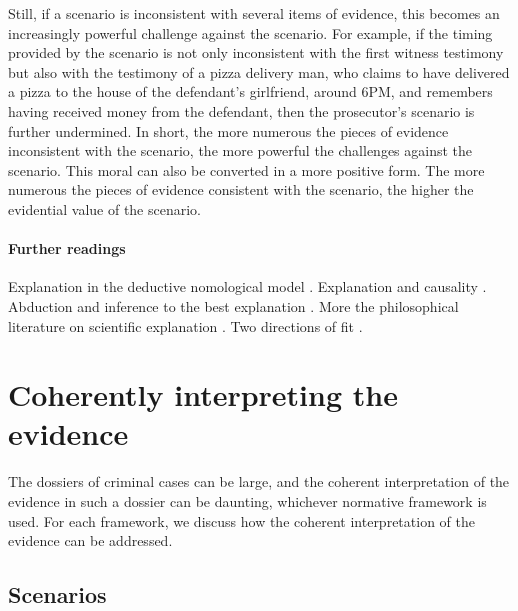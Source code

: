 \documentclass[10pt]{article}
\begin{document}
Still, if a scenario is inconsistent with several items of evidence, this becomes an increasingly powerful challenge against the scenario. 
For example, if the timing provided by the scenario is not only inconsistent 
with the first witness testimony but also with the testimony of a pizza delivery man, 
who claims to have delivered a pizza to the house of the defendant's girlfriend, around 6PM, and remembers having received money 
from the defendant, then the prosecutor's scenario is further undermined. In short, the more numerous the pieces of evidence 
inconsistent with the scenario, the more powerful the challenges against the scenario.
This moral can also be converted in a more positive form. The more numerous the pieces of evidence consistent with the scenario, 
the higher the evidential value of the scenario.







\paragraph{Further readings}

Explanation in the deductive nomological model \citep{hempelOppenhaim1948}. 
Explanation and causality \citep{salmon1984}. 
Abduction and inference to the best explanation \citep{lipton1991}.
More the philosophical literature on 
scientific explanation \citep{woodward2014}. 
Two directions of fit \citep{wells1992}.


\section{Coherently interpreting the evidence}
\label{sec:cohint}

The dossiers of criminal cases can be large, and the coherent interpretation of the evidence in such a dossier can 
be daunting, whichever normative framework is used. For each framework, we discuss how the coherent 
interpretation of the evidence can be addressed.

\subsection{Scenarios}
\end{document}
